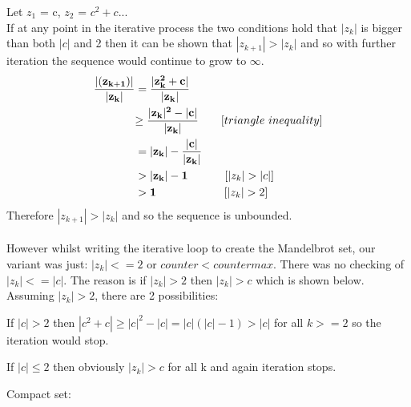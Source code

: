 \documentclass[a4wide, 10pt]{article}
\begin{document}
Let $z_{1}$ = c, $z_{2}$ = $c^2 +c$...\\
If at any point in the iterative process the two conditions hold that $|z_{k}|$ is bigger than both $|c|$ and 2 then it can be shown that $|z_{k+1}| >|z_{k}|$ and so with further iteration the sequence would continue to grow to $\infty$.
\begin{align*}
        \mathbf{\frac{|(z_{k+1})|}{|z_{k}|}} &= \mathbf{\frac{|z_{k}^2 + c|}{|z_{k}|} } 
        \\
        & \mathbf{\geq \frac{|z_{k}|^2-|c|}{|z_{k}|}} \qquad [triangle\ inequality ]  \\ 
        &= \mathbf{|z_{k}| - \frac{|c|}{|z_{k}|} } \\
        &> \mathbf{|z_{k}| -1}   \qquad\hspace{0.45cm}[ |z_{k}| > |c| ] \\ 
        &> \mathbf{1} \qquad \hspace{1.42cm} [ |z_{k}| > 2 ]
\end{align*}
Therefore $|z_{k+1}| > |z_{k}|$ and so the sequence is unbounded. \\   \\
However whilst writing the iterative loop to create the Mandelbrot set, our variant was just: $|z_{k}| <=2$ or $counter < countermax$. There was no checking of $|z_{k}| <= |c|$. The reason  is if $|z_{k}| >2$ then $|z_{k}| > c $ which is shown below.
Assuming $|z_{k}| >2$, there are 2 possibilities:
\begin{list}{*}{}
\item If $|c| >2$ then $|c^2+c| \geq |c|^2 -|c| = |c|(|c|-1) > |c| $ for all $k >= 2$ so the iteration would stop.
\item If $|c| \leq 2$ then obviously $|z_{k}| > c $ for all k and again iteration stops.
\end{list}

Compact set:


\end{document}
